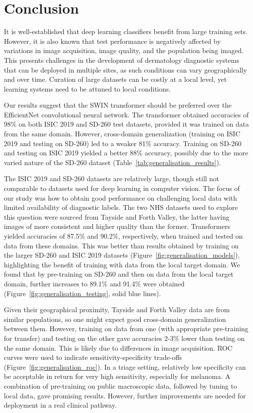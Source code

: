\section{Conclusion}
\label{sec:generalisation_conclusion}
It is well-established that deep learning classifiers benefit from large training sets. However, it is also known that test performance is negatively affected by variations in image acquisition, image quality, and the population being imaged. This presents challenges in the development of dermatology diagnostic systems that can be deployed in multiple sites, as such conditions can vary geographically and over time. Curation of large datasets can be costly at a local level, yet learning systems need to be attuned to local conditions.

Our results suggest that the SWIN transformer should be preferred over the EfficientNet convolutional neural network. The transformer obtained accuracies of 98\% on both ISIC 2019 and SD-260 test datasets, provided it was trained on data from the same domain. However, cross-domain generalization (training on ISIC 2019 and testing on SD-260) led to a weaker 81\% accuracy. Training on SD-260 and testing on ISIC 2019 yielded a better 88\% accuracy, possibly due to the more varied nature of the SD-260 dataset (Table~\ref{tab:generalisation_results}).

The ISIC 2019 and SD-260 datasets are relatively large, though still not comparable to datasets used for deep learning in computer vision. The focus of our study was how to obtain good performance on challenging local data with limited availability of diagnostic labels. The two NHS datasets used to explore this question were sourced from Tayside and Forth Valley, the latter having images of more consistent and higher quality than the former. Transformers yielded accuracies of 87.5\% and 90.2\%, respectively, when trained and tested on data from these domains. This was better than results obtained by training on the larger SD-260 and ISIC 2019 datasets (Figure~\ref{fig:generalisation_models}), highlighting the benefit of training with data from the local target domain. We found that by pre-training on SD-260 and then on data from the local target domain, further increases to 89.1\% and 91.4\% were obtained (Figure~\ref{fig:generalisation_testing}, solid blue lines).

Given their geographical proximity, Tayside and Forth Valley data are from similar populations, so one might expect good cross-domain generalization between them. However, training on data from one (with appropriate pre-training for transfer) and testing on the other gave accuracies 2-3\% lower than testing on the same domain. This is likely due to differences in image acquisition. ROC curves were used to indicate sensitivity-specificity trade-offs (Figure~\ref{fig:generalisation_roc}). In a triage setting, relatively low specificity can be acceptable in return for very high sensitivity, especially for melanoma. A combination of pre-training on public macroscopic data, followed by tuning to local data, gave promising results. However, further improvements are needed for deployment in a real clinical pathway.

